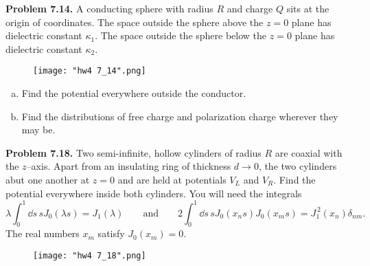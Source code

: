 \documentclass{article}
\begin{document}
\vfill
\noindent\begin{minipage}{\textwidth}
\hrulefill

\textbf{Problem 7.14.} A conducting sphere with radius $R$ and charge $Q$ sits at the origin of coordinates. The space outside the sphere above the $z=0$ plane has dielectric constant $\kappa_1$. The space outside the sphere below the $z = 0$ plane has dielectric constant $\kappa_2$.
\begin{figure}[H]
\centering
\texttt{[image: "hw4 7\_14".png]}
\end{figure}

\begin{enumerate}[(a)]
    \item Find the potential everywhere outside the conductor.
    \item Find the distributions of free charge and polarization charge wherever they may be.
\end{enumerate}

\end{minipage}
\vfill
\noindent\begin{minipage}{\textwidth}
\hrulefill

\textbf{Problem 7.18.} Two semi-infinite, hollow cylinders of radius $R$ are coaxial with the $z$--axis. Apart from an insulating ring of thickness $d \to 0$, the two cylinders abut one another at $z = 0$ and are held at potentials $V_L$ and $V_R$. Find the potential everywhere inside both cylinders. You will need the integrals
\[
    \lambda\int_0^1\dd s\, s J_0(\lambda s) = J_1(\lambda)\quad\quad\text{and}\quad\quad 2\int_0^1\dd s\, s J_0(x_ns)J_0(x_ms) = J_1^{\,2}(x_n)\delta_{nm}.
\]
The real numbers $x_m$ satisfy $J_0(x_m) = 0$.
\begin{figure}[H]
\centering
\texttt{[image: "hw4 7\_18".png]}
\end{figure}

\end{minipage}
\vfill
\end{document}
